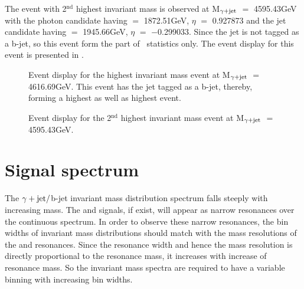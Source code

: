 The event with 2$^{\textrm{nd}}$ highest invariant mass is observed at M$_{\gamma+\mathrm{jet}}$ $=$ 4595.43\unit{GeV} with the photon candidate having \pt $=$ 1872.51\unit{GeV},
$\eta$ $=$ 0.927873 and the jet candidate having \pt $=$ 1945.66\unit{GeV}, $\eta$ $=$ $-$0.299033. Since the jet is not tagged as a b-jet, so this event form
the part of \qstar\ statistics only. The event display for this event is presented in \fig{\ref{fig:evtDisplay_2ndhighest}}. 

\clearpage
\begin{figure}[]
\centering
{} 
\caption{Event display for the highest invariant mass event at M$_{\gamma+\mathrm{jet}}$ $=$ 4616.69\unit{GeV}. This event has the jet tagged as a b-jet, thereby, forming
  a highest \qstar as well as highest \bstar event.}
\label{fig:evtDisplay_highest}
\end{figure}

\begin{figure}[]
\centering
{} 
\caption{Event display for the 2$^{\textrm{nd}}$ highest invariant mass event at M$_{\gamma+\mathrm{jet}}$ $=$ 4595.43\unit{GeV}.}
\label{fig:evtDisplay_2ndhighest}
\end{figure}
\clearpage

\section{Signal spectrum}
The $\gamma+\mathrm{jet}/$b-jet invariant mass distribution spectrum falls steeply with increasing mass. The \qstar and \bstar signals, if exist, will appear
as narrow resonances over the continuous spectrum. In order to observe these narrow resonances, the bin widths of invariant mass distributions should
match with the mass resolutions of the \qstar and \bstar resonances. Since the resonance width and hence the mass resolution is directly proportional to the
resonance mass, it increases with increase of resonance mass. So the invariant mass spectra are required to have a variable binning with increasing bin widths.

